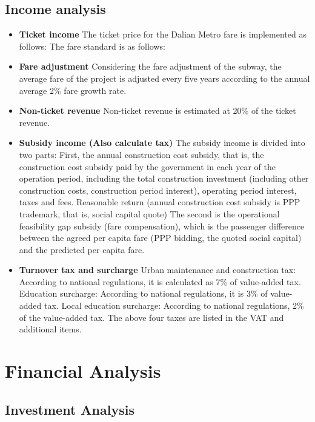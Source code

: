 \documentclass[12pt]{article}
\begin{document}
\subsection{Income analysis}

\begin{itemize}
  \item {\bfseries Ticket income} The ticket price for the Dalian Metro fare is implemented as follows: The fare standard is as follows:
  \item {\bfseries Fare adjustment} Considering the fare adjustment of the subway, the average fare of the project is adjusted every five years according to the annual average 2\% fare growth rate.
  \item {\bfseries Non-ticket revenue}  Non-ticket revenue is estimated at 20\% of the ticket revenue.
  \item {\bfseries Subsidy income (Also calculate tax)} The subsidy income is divided into two parts: First, the annual construction cost subsidy, that is, the construction cost subsidy paid by the government in each year of the operation period, including the total construction investment (including other construction costs, construction period interest), operating period interest, taxes and fees. Reasonable return (annual construction cost subsidy is PPP trademark, that is, social capital quote)
The second is the operational feasibility gap subsidy (fare compensation), which is the passenger difference between the agreed per capita fare (PPP bidding, the quoted social capital) and the predicted per capita fare.
  \item {\bfseries Turnover tax and surcharge} Urban maintenance and construction tax: According to national regulations, it is calculated as 7\% of value-added tax.
 Education surcharge: According to national regulations, it is 3\% of value-added tax.
 Local education surcharge: According to national regulations, 2\% of the value-added tax.
 The above four taxes are listed in the VAT and additional items.
\end{itemize}






\section{Financial Analysis}
\subsection{Investment Analysis}
\end{document}
